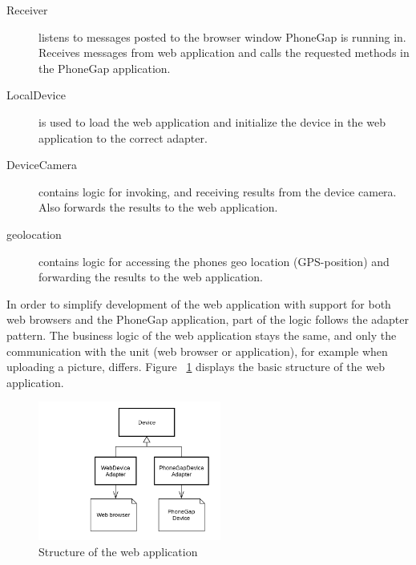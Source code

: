 \begin{description}
	\item[Receiver] listens to messages posted to the browser window PhoneGap is running in. Receives messages from web application and calls the requested methods in the PhoneGap application.
	\item[LocalDevice] is used to load the web application and initialize the device in the web application to the correct adapter.
	\item[DeviceCamera] contains logic for invoking, and receiving results from the device camera. Also forwards the results to the web application.
	\item[geolocation] contains logic for accessing the phones geo location (GPS-position) and forwarding the results to the web application.
\end{description}


In order to simplify development of the web application with support for both web browsers and the PhoneGap application, part of the logic follows the adapter pattern. The business logic of the web application stays the same, and only the communication with the unit (web browser or application), for example when uploading a picture, differs. Figure ~\ref{fig:phonegapwebuml} displays the basic structure of the web application. 

\begin{figure}[h!]
	\centering
    \includegraphics[width=60mm,natwidth=400,natheight=300]{./img/phonegapwebuml.png}
    \caption{Structure of the web application}
        \label{fig:phonegapwebuml}
\end{figure}

